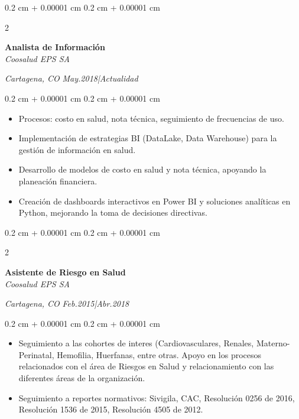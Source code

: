 \documentclass[10pt, letterpaper]{article}
\newenvironment{highlights}{
    \begin{itemize}[
        topsep=0.10 cm,
        parsep=0.10 cm,
        partopsep=0pt,
        itemsep=0pt,
        leftmargin=0.4 cm + 10pt
    ]
}{
    \end{itemize}
} %
\newenvironment{onecolentry}{
    \begin{adjustwidth}{
        0.2 cm + 0.00001 cm
    }{
        0.2 cm + 0.00001 cm
    }
}{
    \end{adjustwidth}
} %
\newenvironment{twocolentry}[2][]{
    \onecolentry
    \def\secondColumn{#2}
    \setcolumnwidth{\fill, 4.5 cm}
    \begin{paracol}{2}
}{
    \switchcolumn \raggedleft \secondColumn
    \end{paracol}
    \endonecolentry
} %
\begin{document}
        \begin{twocolentry}{
            \textit{Cartagena, CO}
            \textit{May.2018|Actualidad}}
            \textbf{Analista de Información} \\
            \textit{Coosalud EPS SA}
        \end{twocolentry}
        \vspace{0.10 cm}
        \begin{onecolentry}
            \begin{highlights}
                \item Procesos: costo en salud, nota técnica, seguimiento de frecuencias de uso.
                \item Implementación de estrategias BI (DataLake, Data Warehouse) para la gestión de información en salud.
                \item Desarrollo de modelos de costo en salud y nota técnica, apoyando la planeación financiera.
                \item Creación de dashboards interactivos en Power BI y soluciones analíticas en Python, mejorando la toma de decisiones directivas.
            \end{highlights}
        \end{onecolentry}
        \vspace{0.2 cm}
        
        \begin{twocolentry}{
            \textit{Cartagena, CO}
            \textit{Feb.2015|Abr.2018}}
            \textbf{Asistente de Riesgo en Salud}\\
            \textit{Coosalud EPS SA}
        \end{twocolentry}
        \vspace{0.10 cm}
        \begin{onecolentry}
            \begin{highlights}
                \item Seguimiento a las cohortes de interes (Cardiovasculares, Renales, Materno-Perinatal, Hemofilia, Huerfanas, entre otras.
                Apoyo en los procesos relacionados con el área de Riesgos en Salud y relacionamiento con las diferentes áreas de la organización.
                \item Seguimiento a reportes normativos: Sivigila, CAC, Resolución 0256 de 2016, Resolución 1536 de 2015, Resolución 4505 de 2012.
            \end{highlights}
        \end{onecolentry}
        \vspace{0.2 cm}
\end{document}
